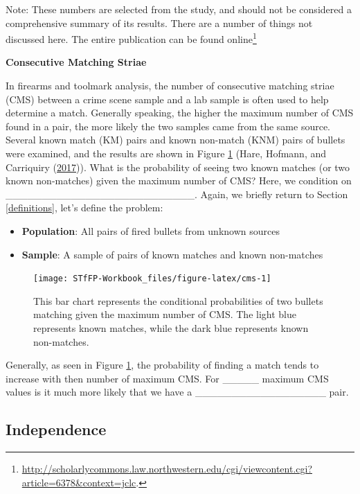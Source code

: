 \documentclass[]{book}
\providecommand{\tightlist}{%
  \setlength{\itemsep}{0pt}\setlength{\parskip}{0pt}}
\let\rmarkdownfootnote\footnote%
\def\footnote{\protect\rmarkdownfootnote}
\theoremstyle{definition}
\theoremstyle{definition}
\theoremstyle{remark}
\begin{document}
Note: These numbers are selected from the study, and should not be
considered a comprehensive summary of its results. There are a number of
things not discussed here. The entire publication can be found
online\footnote{\url{http://scholarlycommons.law.northwestern.edu/cgi/viewcontent.cgi?article=6378\&context=jclc}.}

\textbf{Consecutive Matching Striae}

In firearms and toolmark analysis, the number of consecutive matching
striae (CMS) between a crime scene sample and a lab sample is often used
to help determine a match. Generally speaking, the higher the maximum
number of CMS found in a pair, the more likely the two samples came from
the same source. Several known match (KM) pairs and known non-match
(KNM) pairs of bullets were examined, and the results are shown in
Figure \ref{fig:cms} (Hare, Hofmann, and Carriquiry
(\protect\hyperlink{ref-hare}{2017})). What is the probability of seeing
two known matches (or two known non-matches) given the maximum number of
CMS? Here, we condition on
\_\_\_\_\_\_\_\_\_\_\_\_\_\_\_\_\_\_\_\_\_\_\_\_\_\_. Again, we briefly
return to Section \ref{definitions}, let's define the problem:

\begin{itemize}
\tightlist
\item
  \textbf{Population}: All pairs of fired bullets from unknown sources
\item
  \textbf{Sample}: A sample of pairs of known matches and known
  non-matches
\end{itemize}

\begin{figure}[h]

{\centering \texttt{[image: STfFP-Workbook\_files/figure-latex/cms-1]} 

}

\caption{This bar chart represents the conditional probabilities of two bullets matching given the maximum number of CMS. The light blue represents known matches, while the dark blue represents known non-matches.}\label{fig:cms}
\end{figure}

Generally, as seen in Figure \ref{fig:cms}, the probability of finding a
match tends to increase with then number of maximum CMS. For \_\_\_\_\_
maximum CMS values is it much more likely that we have a
\_\_\_\_\_\_\_\_\_\_\_\_\_\_\_\_\_\_ pair.

\subsection{Independence}\label{independence}
\end{document}
